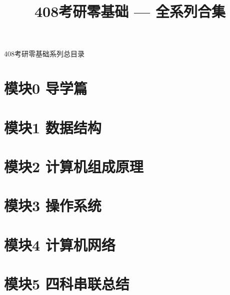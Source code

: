 \documentclass[10pt, aspectratio=169]{beamer}
\title{408考研零基础 --- 全系列合集}
\author{}
\date{}
\begin{document}
\frame{\titlepage}

\begin{frame}{408考研零基础系列总目录}
    \tableofcontents
\end{frame}

\section{模块0 导学篇}


\section{模块1 数据结构}


\section{模块2 计算机组成原理}


\section{模块3 操作系统}


\section{模块4 计算机网络}


\section{模块5 四科串联总结}

\end{document}
